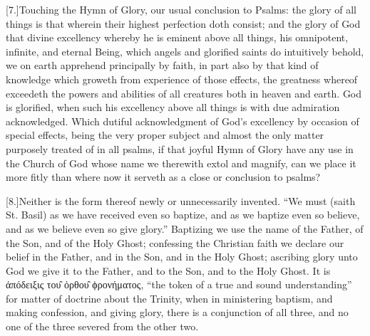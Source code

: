 [7.]Touching the Hymn of Glory, our usual conclusion to Psalms: the glory of all things is that wherein their highest perfection doth consist; and the glory of God that divine excellency whereby he is eminent above all things, his omnipotent, infinite, and eternal Being, which angels and glorified saints do intuitively behold, we on earth apprehend principally by faith, in part also by that kind of knowledge which groweth from experience of those effects, the greatness whereof exceedeth the powers and abilities of all creatures both in heaven and earth. God is glorified, when such his excellency above all things is with due admiration acknowledged. Which dutiful acknowledgment of God’s excellency by occasion of special effects, being the very proper subject and almost the only matter purposely treated of in all psalms, if that joyful Hymn of Glory have any use in the Church of God whose name we therewith extol and magnify, can we place it more fitly than where now it serveth as a close or conclusion to psalms?

[8.]Neither is the form thereof newly or unnecessarily  invented.
 “We must (saith St. Basil) as we have received even so baptize, and as we baptize even so believe, and as we believe even so give glory.” Baptizing we use the name of the Father, of the Son, and of the Holy Ghost; confessing the Christian faith we declare our belief in the Father, and in the Son, and in the Holy Ghost; ascribing glory unto God we give it to the Father, and to the Son, and to the Holy Ghost. It is ἀπόδειξις του̑ ὀρθου̑ ϕρονήματος, “the token of a true and sound understanding” for matter of doctrine about the Trinity, when in ministering baptism, and making confession, and giving glory, there is a conjunction of all three, and no one of the three severed from the other two.

